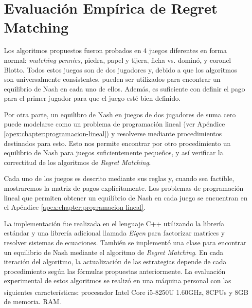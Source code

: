 \section{Evaluación Empírica de Regret Matching}

Los algoritmos propuestos fueron probados en 4 juegos diferentes en forma normal: \textit{matching pennies}, piedra, papel y tijera, ficha vs. dominó, y coronel Blotto. Todos estos juegos son de dos jugadores y, debido a que los algoritmos son universalmente consistentes, pueden ser utilizados para encontrar un equilibrio de Nash en cada uno de ellos. Además, es suficiente con definir el pago para el primer jugador para que el juego esté bien definido. 

Por otra parte, un equilibro de Nash en juegos de dos jugadores de suma cero puede modelarse como un problema de programación lineal \cite[pp.~228-233]{bib:pl-chvatal} (ver Apéndice \ref{apex:chapter:programacion-lineal}) y resolverse mediante procedimientos destinados para esto. Esto nos permite encontrar por otro procedimiento un equilibrio de Nash para juegos suficientemente pequeños, y así verificar la correctitud de los algoritmos de \emph{Regret Matching}. 

Cada uno de los juegos es descrito mediante sus reglas y, cuando sea factible, mostraremos la matriz de pagos explícitamente. Los problemas de programación lineal que permiten obtener un equilibrio de Nash en cada juego se encuentran en el Apéndice \ref{apex:chapter:programacion-lineal}.

La implementación fue realizada en el lenguaje C++ utilizando la librería estándar y una librería adicional llamada \textit{Eigen} \cite{bib:eigen} para factorizar matrices y resolver sistemas de ecuaciones. También se implementó una clase para encontrar un equilibrio de Nash mediante el algoritmo de \textit{Regret Matching}. En cada iteración del algoritmo, la actualización de las estrategias depende de cada procedimiento según las fórmulas propuestas anteriormente. La evaluación experimental de estos algoritmos se realizó en una máquina personal con las siguientes características: procesador Intel\textsuperscript{\textregistered} Core\textsuperscript{\texttrademark} i5-8250U  1.60GHz, 8CPUs y 8GB de memoria. RAM.

